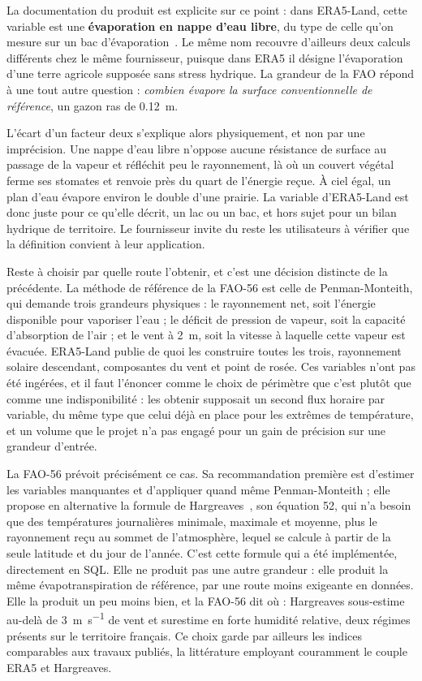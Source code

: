La documentation du produit est explicite sur ce point : dans ERA5-Land, cette variable est une
\textbf{évaporation en nappe d'eau libre}, du type de celle qu'on mesure sur un bac
d'évaporation~\cite{era5land_doc}. Le même nom recouvre d'ailleurs deux calculs différents chez le même
fournisseur, puisque dans ERA5 il désigne l'évaporation d'une terre agricole supposée sans stress
hydrique. La grandeur de la FAO répond à une tout autre question : \emph{combien évapore la
surface conventionnelle de référence}, un gazon ras de \SI{0,12}{\metre}.

L'écart d'un facteur deux s'explique alors physiquement, et non par une imprécision. Une nappe
d'eau libre n'oppose aucune résistance de surface au passage de la vapeur et réfléchit peu le
rayonnement, là où un couvert végétal ferme ses stomates et renvoie près du quart de l'énergie
reçue. À ciel égal, un plan d'eau évapore environ le double d'une prairie. La variable d'ERA5-Land
est donc juste pour ce qu'elle décrit, un lac ou un bac, et hors sujet pour un bilan hydrique de
territoire. Le fournisseur invite du reste les utilisateurs à vérifier que la définition convient
à leur application.

Reste à choisir par quelle route l'obtenir, et c'est une décision distincte de la précédente. La
méthode de référence de la FAO-56 est celle de Penman-Monteith, qui demande trois grandeurs
physiques : le rayonnement net, soit l'énergie disponible pour vaporiser l'eau ; le déficit de
pression de vapeur, soit la capacité d'absorption de l'air ; et le vent à \SI{2}{\metre}, soit la
vitesse à laquelle cette vapeur est évacuée. ERA5-Land publie de quoi les construire toutes les
trois, rayonnement solaire descendant, composantes du vent et point de rosée. Ces variables n'ont
pas été ingérées, et il faut l'énoncer comme le choix de périmètre que c'est plutôt que comme une
indisponibilité : les obtenir supposait un second flux horaire par variable, du même type que
celui déjà en place pour les extrêmes de température, et un volume que le projet n'a pas engagé
pour un gain de précision sur une grandeur d'entrée.

La FAO-56 prévoit précisément ce cas. Sa recommandation première est d'estimer les variables
manquantes et d'appliquer quand même Penman-Monteith ; elle propose en alternative la formule de
Hargreaves~\cite{hargreaves1985}, son équation 52, qui n'a besoin que des températures
journalières minimale, maximale et moyenne, plus le rayonnement reçu au sommet de l'atmosphère,
lequel se calcule à partir de la seule latitude et du jour de l'année. C'est cette formule qui a
été implémentée, directement en SQL. Elle ne produit pas une autre grandeur : elle produit la même
évapotranspiration de référence, par une route moins exigeante en données. Elle la produit un peu
moins bien, et la FAO-56 dit où : Hargreaves sous-estime au-delà de \SI{3}{\metre\per\second} de
vent et surestime en forte humidité relative, deux régimes présents sur le territoire français.
Ce choix garde par ailleurs les indices comparables aux travaux publiés, la littérature employant
couramment le couple ERA5 et Hargreaves.

